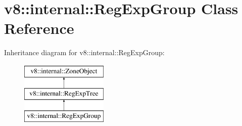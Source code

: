 \hypertarget{classv8_1_1internal_1_1RegExpGroup}{}\section{v8\+:\+:internal\+:\+:Reg\+Exp\+Group Class Reference}
\label{classv8_1_1internal_1_1RegExpGroup}
Inheritance diagram for v8\+:\+:internal\+:\+:Reg\+Exp\+Group\+:\begin{figure}[H]
\begin{center}
\leavevmode
\includegraphics[height=3.000000cm]{classv8_1_1internal_1_1RegExpGroup}
\end{center}
\end{figure}
